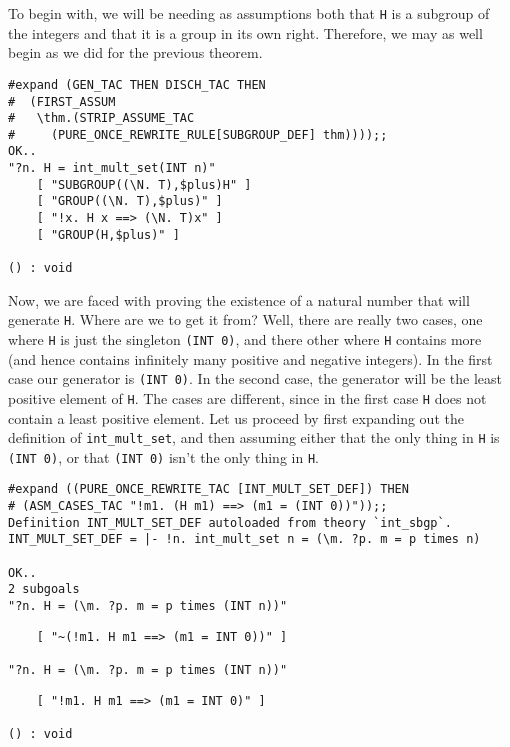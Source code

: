 To begin with, we will be needing as assumptions both that {\small\tt H} is
a subgroup of the integers and that it is a group in its own right.
Therefore, we may as well begin as we did for the previous theorem.
\begin{session}
\begin{verbatim}
#expand (GEN_TAC THEN DISCH_TAC THEN
#  (FIRST_ASSUM
#   \thm.(STRIP_ASSUME_TAC
#     (PURE_ONCE_REWRITE_RULE[SUBGROUP_DEF] thm))));;
OK..
"?n. H = int_mult_set(INT n)"
    [ "SUBGROUP((\N. T),$plus)H" ]
    [ "GROUP((\N. T),$plus)" ]
    [ "!x. H x ==> (\N. T)x" ]
    [ "GROUP(H,$plus)" ]

() : void
\end{verbatim}
\end{session}
Now, we are faced with proving the existence of a natural number that
will generate {\small\tt H}.  Where are we to get it from?   Well,
there are really two cases, one where {\small\tt H} is just the
singleton {\small\verb+(INT 0)+}, and there other where {\small\tt H}
contains more (and hence contains infinitely many positive and
negative integers).  In the first case our generator is
{\small\verb+(INT 0)+}.  In the  second case, the generator will be
the least positive element of {\small\tt H}.  The cases are different,
since in the first case {\small\tt H} does not contain a least
positive element.  Let us proceed by first expanding out the
definition of {\small\verb+int_mult_set+}, and then assuming either
that the only thing in {\small\tt H} is {\small\verb+(INT 0)+}, or that
{\small\verb+(INT 0)+} isn't the only thing in {\small\tt H}.
\begin{session}
\begin{verbatim}
#expand ((PURE_ONCE_REWRITE_TAC [INT_MULT_SET_DEF]) THEN
# (ASM_CASES_TAC "!m1. (H m1) ==> (m1 = (INT 0))"));;
Definition INT_MULT_SET_DEF autoloaded from theory `int_sbgp`.
INT_MULT_SET_DEF = |- !n. int_mult_set n = (\m. ?p. m = p times n)

OK..
2 subgoals
"?n. H = (\m. ?p. m = p times (INT n))"
\end{verbatim}
\mvdots
\begin{verbatim}
    [ "~(!m1. H m1 ==> (m1 = INT 0))" ]

"?n. H = (\m. ?p. m = p times (INT n))"
\end{verbatim}
\mvdots
\begin{verbatim}
    [ "!m1. H m1 ==> (m1 = INT 0)" ]

() : void
\end{verbatim}
\end{session}

